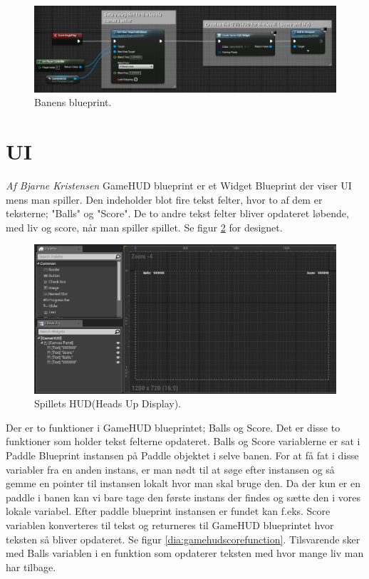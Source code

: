 \begin{figure}
	\begin{center}
		\caption{Banens blueprint.}
		\label{dia:levelblueprint}
		\includegraphics[width=0.98\linewidth]{pictures/blueprints/level_blueprint}
	\end{center}
\end{figure}

\section{UI}
\textit{Af Bjarne Kristensen}\newline
GameHUD blueprint er et Widget Blueprint der viser UI mens man spiller. Den indeholder blot fire tekst felter, hvor to af dem er teksterne; "Balls" og "Score". De to andre tekst felter bliver opdateret løbende, med liv og score, når man spiller spillet. Se figur \ref{dia:gamehuddesign} for designet.

\begin{figure}
	\begin{center}
		\caption{Spillets HUD(Heads Up Display).}
		\label{dia:gamehuddesign}
		\includegraphics[width=0.98\linewidth]{pictures/blueprints/gamehud-design}
	\end{center}
\end{figure}

Der er to funktioner i GameHUD blueprintet; Balls og Score. Det er disse to funktioner som holder tekst felterne opdateret. Balls og Score variablerne er sat i Paddle Blueprint instansen på Paddle objektet i selve banen. For at få fat i disse variabler fra en anden instans, er man nødt til at søge efter instansen og så gemme en pointer til instansen lokalt hvor man skal bruge den. Da der kun er en paddle i banen kan vi bare tage den første instans der findes og sætte den i vores lokale variabel. Efter paddle blueprint instansen er fundet kan f.eks. Score variablen konverteres til tekst og returneres til GameHUD blueprintet hvor teksten så bliver opdateret. Se figur \ref{dia:gamehudscorefunction}. Tilsvarende sker med Balls variablen i en funktion som opdaterer teksten med hvor mange liv man har tilbage.

